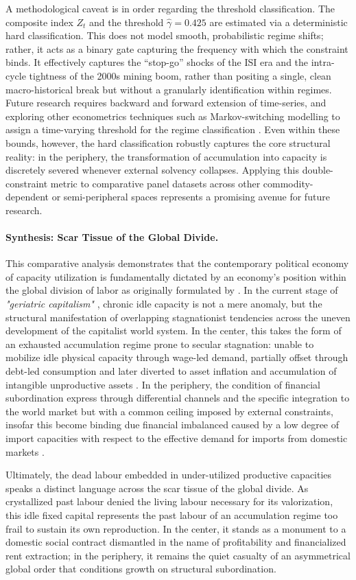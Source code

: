 A methodological caveat is in order regarding the threshold classification. The composite index $Z_t$ and the threshold $\hat{\gamma} = 0.425$ are estimated via a deterministic hard classification. This does not model smooth, probabilistic regime shifts; rather, it acts as a binary gate capturing the frequency with which the constraint binds. It effectively captures the ``stop-go'' shocks of the ISI era and the intra-cycle tightness of the 2000s mining boom, rather than positing a single, clean macro-historical break but without a granularly identification within regimes. Future research requires backward and forward extension of time-series, and exploring other econometrics techniques such as Markov-switching modelling to assign a time-varying threshold for the regime classification . Even within these bounds, however, the hard classification robustly captures the core structural reality: in the periphery, the transformation of accumulation into capacity is discretely severed whenever external solvency collapses. Applying this double-constraint metric to comparative panel datasets across other commodity-dependent or semi-peripheral spaces represents a promising avenue for future research.

\paragraph{Synthesis: Scar Tissue of the Global Divide.}
This comparative analysis demonstrates that the contemporary political economy of capacity utilization is fundamentally dictated by an economy's position within the global division of labor as originally formulated by \citet{Prebisch1981}. In the current stage of \textit{"geriatric capitalism"} \citep{Vidal2019}, chronic idle capacity is not a mere anomaly, but the structural manifestation of overlapping stagnationist tendencies across the uneven development of the capitalist world system. In the center, this takes the form of an exhausted accumulation regime prone to secular stagnation: unable to mobilize idle physical capacity through wage-led demand, partially offset through debt-led consumption and later diverted to asset inflation and accumulation of intangible unproductive assets \citep{Rotta2018, Rikap2021}. In the periphery, the condition of financial subordination express through differential channels and the specific integration to the world market but with a common ceiling imposed by external constraints, insofar this become binding due financial imbalanced caused by a low degree of import capacities with respect to the effective demand for imports from domestic markets \citep{McCombieThirwall1994}.

Ultimately, the dead labour embedded in under-utilized productive capacities speaks a distinct language across the scar tissue of the global divide. As crystallized past labour denied the living labour necessary for its valorization, this idle fixed capital represents the past labour of an accumulation regime too frail to sustain its own reproduction. In the center, it stands as a monument to a domestic social contract dismantled in the name of profitability and financialized rent extraction; in the periphery, it remains the quiet casualty of an asymmetrical global order that conditions growth on structural subordination.